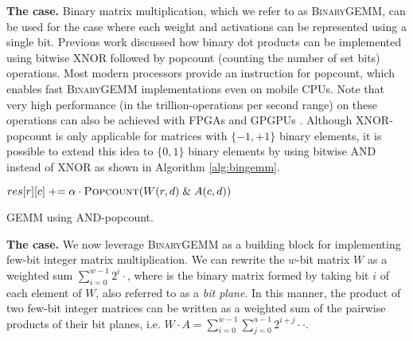 \documentclass[sigconf]{acmart}
\begin{document}
\label{sec:bingemm}
\textbf{The  case.}
Binary matrix multiplication, which we refer to as \textsc{BinaryGEMM}, can be used for the case where each weight and activations can be represented using a single bit.
Previous work \cite{fptbnn, binarynet, xnornet} discussed how binary dot products can be implemented using bitwise XNOR followed by popcount (counting the number of set bits) operations.
Most modern processors provide an instruction for popcount, which enables fast \textsc{BinaryGEMM} implementations even on mobile CPUs.
Note that very high performance (in the trillion-operations per second range) on these operations can also be achieved with FPGAs \cite{finn,fptbnn} and GPGPUs \cite{binarynet}.
Although XNOR-popcount is only applicable for matrices with $\{-1, +1\}$ binary elements, it is possible to extend this idea to $\{0, 1\}$ binary elements by using bitwise AND instead of XNOR as shown in Algorithm \ref{alg:bingemm}.


\begin{algorithm}[t]
	\centering
	\footnotesize
	\begin{algorithmic}
		\algrenewcommand\algorithmicindent{1.0em}%
					\State $res[r][c] \pluseq \alpha \cdot \Call{Popcount}{W(r, d) \mathrel{\&} A(c, d)} $
				\EndFor
			\EndFor
		\EndFor

		\EndFunction
	\end{algorithmic}
	\caption{ GEMM using AND-popcount.}
	\label{alg:bingemm}
\end{algorithm}

\textbf{The  case.}
\label{sec:bsgemm}
We now leverage \textsc{BinaryGEMM} as a building block for implementing few-bit integer matrix multiplication.
We can rewrite the $w$-bit matrix $W$ as a weighted sum $\sum_{i=0}^{w-1} 2^i \cdot$, where  is the binary matrix formed by taking bit $i$ of each element of $W$, also referred to as a \emph{bit plane}.
In this manner, the product of two few-bit integer matrices can be written as a weighted sum of the pairwise products of their bit planes, i.e. $W \cdot A = \sum_{i=0}^{w-1} \sum_{j=0}^{a-1} 2^{i+j} \cdot$$\cdot$.
\end{document}
